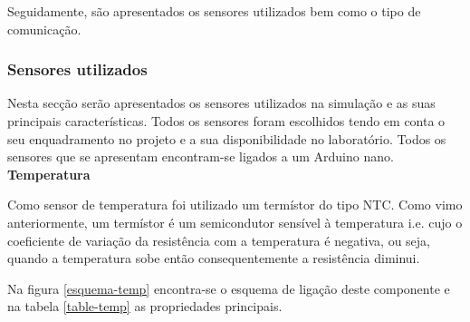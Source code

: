 Seguidamente, são apresentados os sensores utilizados bem como o tipo de comunicação. 
 

\subsubsection{Sensores utilizados}

Nesta secção serão apresentados os sensores utilizados na simulação e as suas principais características. Todos os sensores foram escolhidos tendo em conta o seu enquadramento no projeto e a sua disponibilidade no laboratório. Todos os sensores que se apresentam encontram-se ligados a um Arduino nano. \\

\newpage
\textbf{Temperatura}


Como sensor de temperatura foi utilizado um termístor do tipo \ac{NTC}. Como vimo anteriormente, um termístor é um semicondutor sensível à temperatura i.e. cujo o coeficiente de variação da resistência com a temperatura é negativa, ou seja, quando a temperatura sobe então consequentemente a resistência diminui. 

Na figura \ref{esquema-temp} encontra-se o esquema de ligação deste componente e na tabela \ref{table-temp} as propriedades principais. 


